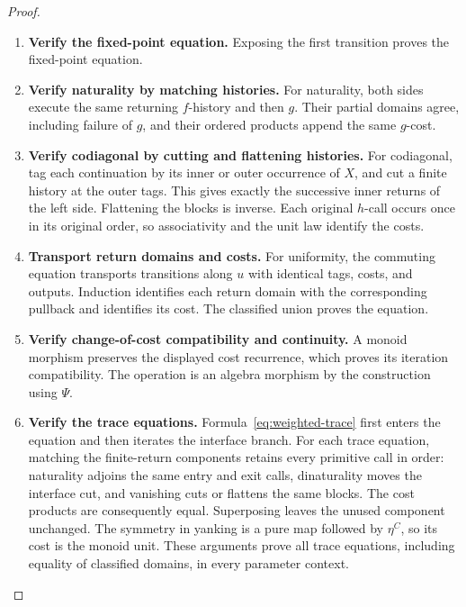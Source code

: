 \documentclass[11pt,a4paper]{article}
\numberwithin{algorithm}{section}
\numberwithin{equation}{section}
\theoremstyle{definition}
\theoremstyle{remark}
\theoremstyle{plain}
\theoremstyle{definition}
\theoremstyle{plain}
\begin{document}
\begin{proof}\leavevmode
\begin{enumerate}[leftmargin=*,align=left]
\item \textbf{Verify the fixed-point equation.}
Exposing the first transition proves the fixed-point equation.

\item \textbf{Verify naturality by matching histories.}
For
naturality, both sides execute the same returning $f$-history and then
$g$. Their partial domains agree, including failure of $g$, and their
ordered products append the same $g$-cost.

\item \textbf{Verify codiagonal by cutting and flattening histories.}
For codiagonal, tag each
continuation by its inner or outer occurrence of $X$, and cut a finite
history at the outer tags. This gives exactly the successive inner
returns of the left side. Flattening the blocks is inverse. Each original
$h$-call occurs once in its original order, so associativity and the unit
law identify the costs.

\item \textbf{Transport return domains and costs.}
For uniformity, the commuting equation transports transitions along $u$
with identical tags, costs, and outputs. Induction identifies each
return domain with the corresponding pullback and identifies its cost.
The classified union proves the equation.

\item \textbf{Verify change-of-cost compatibility and continuity.}
A monoid morphism preserves
the displayed cost recurrence, which proves its iteration compatibility.
The operation is an algebra morphism by the construction using $\Psi$.

\item \textbf{Verify the trace equations.}
Formula~\eqref{eq:weighted-trace} first enters the equation and then
iterates the interface branch. For each trace equation, matching the
finite-return components retains every primitive call in order: naturality
adjoins the same entry and exit calls, dinaturality moves the interface
cut, and vanishing cuts or flattens the same blocks. The cost products
are consequently equal. Superposing leaves the unused component
unchanged. The symmetry in yanking is a pure map followed by $\eta^C$,
so its cost is the monoid unit. These arguments prove all trace equations,
including equality of classified domains, in every parameter context.
\end{enumerate}
\end{proof}
\end{document}
